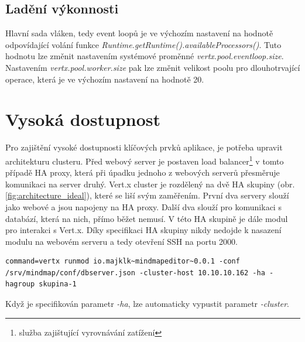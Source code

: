 \subsection{Ladění výkonnosti}\label{sub:performenceScale}

Hlavní sada vláken, tedy event loopů je ve výchozím nastavení na hodnotě odpovídající volání funkce \emph{Runtime.getRuntime().availableProcessors()}. Tuto hodnotu lze změnit nastavením systémové proměnné \emph{vertx.pool.eventloop.size}. Nastavením \emph{vertx.pool.worker.size} pak lze změnit velikost poolu pro dlouhotrvající operace, která je ve výchozím nastavení na hodnotě 20.

\section{Vysoká dostupnost}

Pro zajištění vysoké dostupnosti klíčových prvků aplikace, je potřeba upravit architekturu clusteru. Před webový server je postaven load balancer\footnote{služba zajištující vyrovnávání zatížení} v tomto případě HA proxy, která při úpadku jednoho z webových serverů přesměruje komunikaci na server druhý. Vert.x cluster je rozdělený na dvě HA skupiny (obr.\ref{fig:architecture_ideal}), které se liší svým zaměřením. První dva servery slouží jako webové a jsou napojeny na HA proxy. Další dva slouží pro komunikaci s databází, která na nich, přímo běžet nemusí. V této HA skupině je dále modul pro interakci s Vert.x. Díky specifikaci HA skupiny nikdy nedojde k nasazení modulu na webovém serveru a tedy otevření SSH na portu 2000.

\begin{lstlisting}[caption=Vysoká dostupnost na databázovém serveru 2]
command=vertx runmod io.majklk~mindmapeditor~0.0.1 -conf /srv/mindmap/conf/dbserver.json -cluster-host 10.10.10.162 -ha -hagroup skupina-1
\end{lstlisting}

Když je specifikován parametr \emph{-ha}, lze automaticky vypustit parametr \emph{-cluster}.

